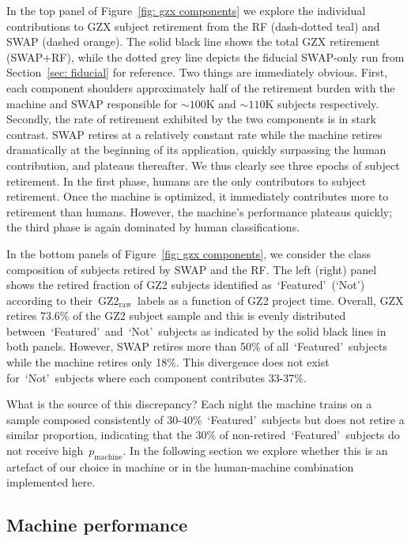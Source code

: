 \documentclass[twocolumn,  trackchanges, ]{aastex6}%
\newcommand{\feat}{`Featured'}
\newcommand{\notfeat}{`Not'}
\newcommand{\raw}{GZ2$_{\text{raw}}$}
\newcommand{\pmachine}{$p_{\mathrm{machine}}$}
\begin{document}
In the top panel of Figure~\ref{fig: gzx components} we explore the individual 
contributions to GZX subject retirement from the RF (dash-dotted teal) 
and SWAP (dashed orange). The solid black line shows the total GZX retirement (SWAP+RF), while the dotted grey line depicts the fiducial SWAP-only run from 
Section~\ref{sec: fiducial} for reference. 
Two things are immediately obvious. First, each component shoulders approximately
half of the retirement burden with the machine and SWAP responsible for 
$\sim$$100$K and $\sim$$110$K subjects respectively.  
Secondly, the rate of retirement exhibited by the two components is in stark contrast.
SWAP retires at a relatively constant rate while the machine retires 
dramatically at the beginning of its application, quickly surpassing the human 
contribution, and plateaus thereafter. 
We thus clearly see three epochs of subject retirement.
In the first phase, humans are the only contributors to subject retirement.  
Once the machine is optimized, it immediately contributes more to retirement than humans.
However, the machine's performance plateaus quickly;  the third 
phase is again dominated by human classifications.


In the bottom panels of Figure~\ref{fig: gzx components}, we consider the class
composition of subjects retired by SWAP and the RF. 
The left (right) panel shows the retired fraction of GZ2 subjects identified 
as~\feat~(\notfeat) according to their~\raw~labels as a function of GZ2 project time. 
Overall, GZX retires 73.6\% of the GZ2 subject sample and this is evenly 
distributed between~\feat~and~\notfeat~subjects as indicated by the solid
black lines in both panels. 
However, SWAP retires more than 50\% of all~\feat~subjects while the machine
retires only 18\%. This divergence does not exist for~\notfeat~subjects where
each component contributes 33-37\%. 

What is the source of this discrepancy? 
Each night the machine trains on a sample composed consistently of 30-40\%~\feat~subjects but does not retire a similar proportion, indicating
that the 30\% of non-retired~\feat~subjects do not receive high~\pmachine. 
In the following section we explore whether this is an artefact of our choice in machine 
or in the human-machine combination implemented here. 

\subsection{Machine performance}\label{sec: machine performance}
\end{document}
